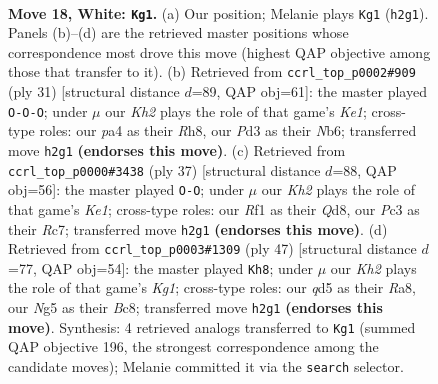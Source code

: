 \documentclass[11pt]{article}
\begin{document}
\begin{figure}[p]
\label{fig:thought-m32}
\end{figure}

\clearpage

\begin{figure}[p]\centering
\begin{subfigure}{0.46\textwidth}\centering
\resizebox{\linewidth}{!}{%
\newchessgame
\chessboard[
  setfen={r1b2rk1/5p2/2p2np1/3qp1Np/p1p4P/2PP2P1/P1P2P1K/R1B1QR2 w - - 0 18},
  showmover=false,
  pgfstyle=straightmove, color=movearrow, markmove={h2-g1}
]}
\caption{}
\end{subfigure}\hfill
\begin{subfigure}{0.46\textwidth}\centering
\resizebox{\linewidth}{!}{%
\newchessgame
\chessboard[
  setfen={r3k2r/ppp4p/1n1p1qp1/3Ppb2/2P4P/2N1QP2/PP4P1/2KR1B1R b kq - 0 16},
  showmover=false,
  pgfstyle=straightmove, color=movearrow, markmove={e8-c8}
]}
\caption{}
\end{subfigure}
\\[4pt]
\begin{subfigure}{0.46\textwidth}\centering
\resizebox{\linewidth}{!}{%
\newchessgame
\chessboard[
  setfen={3qk2r/2rnbppp/1pp1p3/3pPP2/PP1P2P1/3Q4/2N4P/R1B2RK1 b k - 0 19},
  showmover=false,
  pgfstyle=straightmove, color=movearrow, markmove={e8-g8}
]}
\caption{}
\end{subfigure}\hfill
\begin{subfigure}{0.46\textwidth}\centering
\resizebox{\linewidth}{!}{%
\newchessgame
\chessboard[
  setfen={r1bqnrk1/7p/pp1p4/2pPpPp1/P3P1PP/2N4R/1P2B1Q1/R5K1 b - - 1 24},
  showmover=false,
  pgfstyle=straightmove, color=movearrow, markmove={g8-h8}
]}
\caption{}
\end{subfigure}
\caption{\textbf{Move 18, White: \texttt{Kg1}.} (a) Our position; Melanie plays \texttt{Kg1} (\texttt{h2g1}). Panels (b)--(d) are the retrieved master positions whose correspondence most drove this move (highest QAP objective among those that transfer to it). (b) Retrieved from \texttt{ccrl\_top\_p0002\#909} (ply 31) [structural distance $d$=89, QAP obj=61]: the master played \texttt{O-O-O}; under $\mu$ our \emph{Kh2} plays the role of that game's \emph{Ke1}; cross-type roles: our \emph{p}a4 as their \emph{R}h8, our \emph{P}d3 as their \emph{N}b6; transferred move \texttt{h2g1} \textbf{(endorses this move)}. (c) Retrieved from \texttt{ccrl\_top\_p0000\#3438} (ply 37) [structural distance $d$=88, QAP obj=56]: the master played \texttt{O-O}; under $\mu$ our \emph{Kh2} plays the role of that game's \emph{Ke1}; cross-type roles: our \emph{R}f1 as their \emph{Q}d8, our \emph{P}c3 as their \emph{R}c7; transferred move \texttt{h2g1} \textbf{(endorses this move)}. (d) Retrieved from \texttt{ccrl\_top\_p0003\#1309} (ply 47) [structural distance $d$=77, QAP obj=54]: the master played \texttt{Kh8}; under $\mu$ our \emph{Kh2} plays the role of that game's \emph{Kg1}; cross-type roles: our \emph{q}d5 as their \emph{R}a8, our \emph{N}g5 as their \emph{B}c8; transferred move \texttt{h2g1} \textbf{(endorses this move)}. Synthesis: 4 retrieved analogs transferred to \texttt{Kg1} (summed QAP objective 196, the strongest correspondence among the candidate moves); Melanie committed it via the \texttt{search} selector.}

\end{figure}
\end{document}
